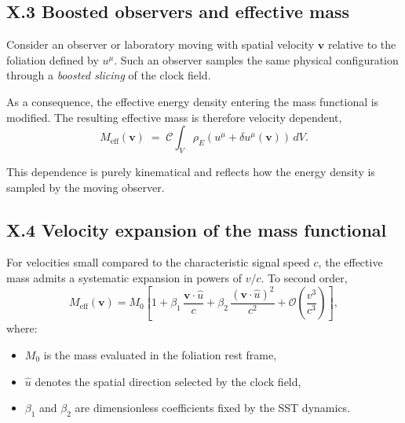 \documentclass[10pt]{article}
\begin{document}
    \subsection*{X.3 Boosted observers and effective mass}

        Consider an observer or laboratory moving with spatial velocity $\mathbf{v}$
        relative to the foliation defined by $u^\mu$.
        Such an observer samples the same physical configuration through a
        \emph{boosted slicing} of the clock field.

        As a consequence, the effective energy density entering the mass functional
        is modified. The resulting effective mass is therefore velocity dependent,
        \begin{equation}
            M_{\mathrm{eff}}(\mathbf{v})
            \;=\;
            \mathcal{C}
            \int_V
            \rho_{\!E}\!\left(u^\mu + \delta u^\mu(\mathbf{v})\right)
            \, dV .
        \end{equation}

        This dependence is purely kinematical and reflects how the energy density is
        sampled by the moving observer.

    \subsection*{X.4 Velocity expansion of the mass functional}

        For velocities small compared to the characteristic signal speed $c$,
        the effective mass admits a systematic expansion in powers of $v/c$.
        To second order,
        \begin{equation}
            M_{\mathrm{eff}}(\mathbf{v})
            =
            M_0
            \left[
                1
                + \beta_1 \, \frac{\mathbf{v}\!\cdot\!\hat{u}}{c}
                + \beta_2 \, \frac{(\mathbf{v}\!\cdot\!\hat{u})^2}{c^2}
                + \mathcal{O}\!\left(\frac{v^3}{c^3}\right)
            \right],
        \end{equation}
        where:
        \begin{itemize}
            \item $M_0$ is the mass evaluated in the foliation rest frame,
            \item $\hat{u}$ denotes the spatial direction selected by the clock field,
            \item $\beta_1$ and $\beta_2$ are dimensionless coefficients fixed by the SST
            dynamics.
        \end{itemize}
\end{document}
